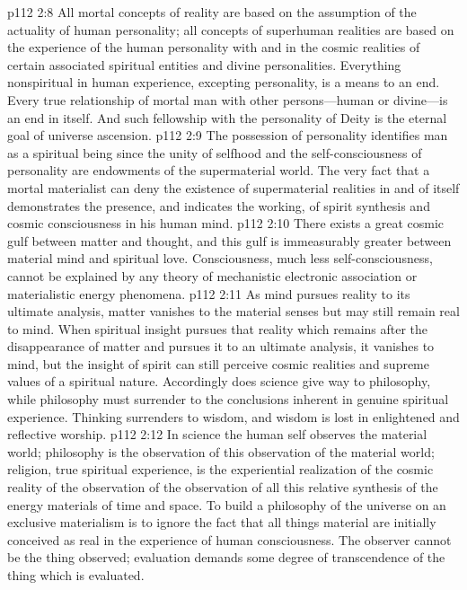 \vs p112 2:8 All mortal concepts of reality are based on the assumption of the actuality of human personality; all concepts of superhuman realities are based on the experience of the human personality with and in the cosmic realities of certain associated spiritual entities and divine personalities. Everything nonspiritual in human experience, excepting personality, is a means to an end. Every true relationship of mortal man with other persons---human or divine---is an end in itself. And such fellowship with the personality of Deity is the eternal goal of universe ascension.
\vs p112 2:9 The possession of personality identifies man as a spiritual being since the unity of selfhood and the self\hyp{}consciousness of personality are endowments of the supermaterial world. The very fact that a mortal materialist can deny the existence of supermaterial realities in and of itself demonstrates the presence, and indicates the working, of spirit synthesis and cosmic consciousness in his human mind.
\vs p112 2:10 There exists a great cosmic gulf between matter and thought, and this gulf is immeasurably greater between material mind and spiritual love. Consciousness, much less self\hyp{}consciousness, cannot be explained by any theory of mechanistic electronic association or materialistic energy phenomena.
\pc \vs p112 2:11 As mind pursues reality to its ultimate analysis, matter vanishes to the material senses but may still remain real to mind. When spiritual insight pursues that reality which remains after the disappearance of matter and pursues it to an ultimate analysis, it vanishes to mind, but the insight of spirit can still perceive cosmic realities and supreme values of a spiritual nature. Accordingly does science give way to philosophy, while philosophy must surrender to the conclusions inherent in genuine spiritual experience. Thinking surrenders to wisdom, and wisdom is lost in enlightened and reflective worship.
\vs p112 2:12 In science the human self observes the material world; philosophy is the observation of this observation of the material world; religion, true spiritual experience, is the experiential realization of the cosmic reality of the observation of the observation of all this relative synthesis of the energy materials of time and space. To build a philosophy of the universe on an exclusive materialism is to ignore the fact that all things material are initially conceived as real in the experience of human consciousness. The observer cannot be the thing observed; evaluation demands some degree of transcendence of the thing which is evaluated.
